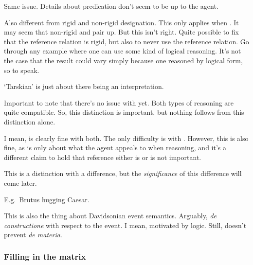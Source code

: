\begin{note}
  Same issue.
  Details about predication don't seem to be up to the agent.
\end{note}

\begin{note}
  Also different from rigid and non-rigid designation.
  This only applies when \ur{}.
  It may seem that non-rigid and \nr{} pair up.
  But this isn't right.
  Quite possible to fix that the reference relation is rigid, but also to never use the reference relation.
  Go through any example where one can use some kind of logical reasoning.
  It's not the case that the result could vary simply because one reasoned by logical form, so to speak.
\end{note}

\begin{note}
  `Tarskian' is just about there being an interpretation.
\end{note}

\begin{note}[\ESU{}]
  Important to note that there's no issue with \ESU{} yet.
  Both types of reasoning are quite compatible.
  So, this distinction is important, but nothing follows from this distinction alone.

  I mean, \nr{} is clearly fine with both.
  The only difficulty is with \ur{}.
  However, this is also fine, as \ESU{} is only about what the agent appeals to when reasoning, and it's a different claim to hold that reference either is or is not important.

  This is a distinction with a difference, but the \emph{significance} of this difference will come later.
\end{note}

\begin{note}
  E.g.\ Brutus hugging Caesar.

  This is also the thing about Davidsonian event semantics.
  Arguably, \emph{de constructione} with respect to the event.
  I mean, motivated by logic.
  Still, doesn't prevent \emph{de materia}.
\end{note}

\subsubsection{Filling in the matrix}
\label{sec:filling-matrix}

